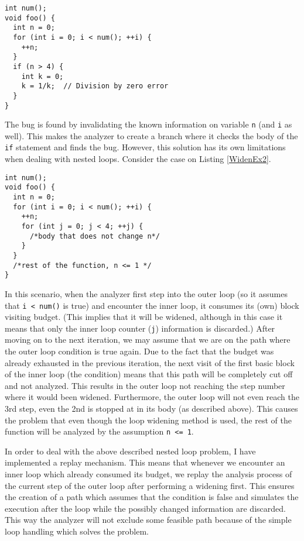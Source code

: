 \documentclass[oneside, a4paper, 12pt]{article}
\theoremstyle{definition}
\begin{document}
\begin{lstlisting}
int num();
void foo() {
  int n = 0;
  for (int i = 0; i < num(); ++i) {
    ++n;
  }
  if (n > 4) {
    int k = 0;
    k = 1/k;  // Division by zero error
  }
}\end{lstlisting}

The bug is found by invalidating the known information on variable
\texttt{n} (and \texttt{i} as well). This makes the analyzer to create a 
branch
where it checks the body of the \texttt{if} statement and finds the bug.
However, this solution has its own limitations when dealing with nested 
loops. 
Consider the case on Listing \ref{WidenEx2}.
\begin{lstlisting}
int num();
void foo() {
  int n = 0;
  for (int i = 0; i < num(); ++i) {
    ++n;
    for (int j = 0; j < 4; ++j) {
      /*body that does not change n*/
    }
  }
  /*rest of the function, n <= 1 */
}\end{lstlisting}

In this scenario, when the analyzer first step into the outer loop (so it assumes
that \texttt{i < num()} is true) and encounter the inner loop, it consumes
its (own) block visiting budget. (This implies that it will be widened, although
in this case it means that only the inner loop counter (\texttt{j}) information
is discarded.) After moving on to the next iteration, we may assume that we
are on the path where the outer loop condition is true again. Due to the fact that the budget was already exhausted in the previous iteration, the next visit of the first
basic block of the inner loop (the condition) means that this path will be
completely cut off and not analyzed. This results in the outer loop not reaching the step number where it would been widened. Furthermore, the outer loop
will not even reach the 3rd step, even the 2nd is stopped at in its body
(as described above). This causes the problem that even though the 
loop widening method is used, the rest of the function will be analyzed by the 
assumption \texttt{n <= 1}.

In order to deal with the above described nested loop problem, I have 
implemented a replay mechanism. This means that whenever we encounter an inner 
loop which already consumed its budget, we replay the analysis process of the 
current step of the outer loop after performing a widening first. This ensures
the creation of a path which assumes that the condition is false and simulates 
the execution after the loop while the possibly changed information are 
discarded. This way the analyzer will not exclude some feasible path 
because of the simple loop handling which solves the problem.
\end{document}
